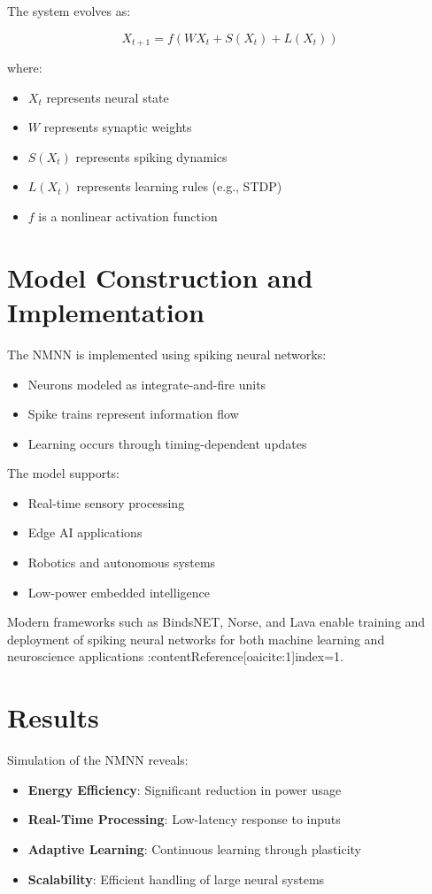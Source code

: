 \documentclass[12pt]{article}
\begin{document}
The system evolves as:

\[
X_{t+1} = f(WX_t + S(X_t) + L(X_t))
\]

where:
\begin{itemize}
\item $X_t$ represents neural state
\item $W$ represents synaptic weights
\item $S(X_t)$ represents spiking dynamics
\item $L(X_t)$ represents learning rules (e.g., STDP)
\item $f$ is a nonlinear activation function
\end{itemize}

\section{Model Construction and Implementation}

The NMNN is implemented using spiking neural networks:

\begin{itemize}
\item Neurons modeled as integrate-and-fire units
\item Spike trains represent information flow
\item Learning occurs through timing-dependent updates
\end{itemize}

The model supports:

\begin{itemize}
\item Real-time sensory processing
\item Edge AI applications
\item Robotics and autonomous systems
\item Low-power embedded intelligence
\end{itemize}

Modern frameworks such as BindsNET, Norse, and Lava enable training and deployment of spiking neural networks for both machine learning and neuroscience applications :contentReference[oaicite:1]{index=1}.

\section{Results}

Simulation of the NMNN reveals:

\begin{itemize}
\item \textbf{Energy Efficiency}: Significant reduction in power usage
\item \textbf{Real-Time Processing}: Low-latency response to inputs
\item \textbf{Adaptive Learning}: Continuous learning through plasticity
\item \textbf{Scalability}: Efficient handling of large neural systems
\end{itemize}
\end{document}
